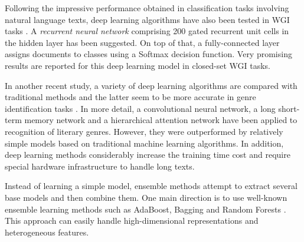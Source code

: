 Following the impressive performance obtained in classification tasks involving natural language texts, deep learning algorithms have also been tested in WGI tasks \parencite{strobel2018text}. A \textit{recurrent neural network} comprising 200 gated recurrent unit cells in the hidden layer has been suggested. On top of that, a fully-connected layer assigns documents to classes using a Softmax decision function. Very promising results are reported for this deep learning model in closed-set WGI tasks. 

In another recent study, a variety of deep learning algorithms are compared with traditional methods and the latter seem to be more accurate in genre identification tasks \parencite{worsham2018genre}. In more detail, a convolutional neural network, a long short-term memory network and a hierarchical attention network have been applied to recognition of literary genres. However, they were outperformed by relatively simple models based on traditional machine learning algorithms. In addition, deep learning methods considerably increase the training time cost and require special hardware infrastructure to handle long texts.

Instead of learning a simple model, ensemble methods attempt to extract several base models and then combine them. One main direction is to use well-known ensemble learning methods such as AdaBoost, Bagging and Random Forests \parencite{sugiyanto2014term,onan2018ensemble,worsham2018genre}. This approach can easily handle high-dimensional representations and heterogeneous features.



